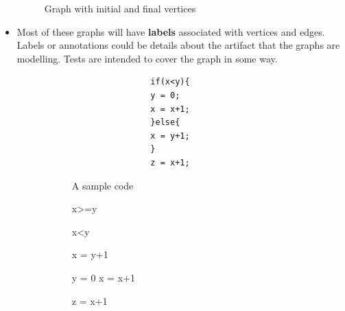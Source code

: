 \documentclass[a4paper]{article}
\begin{document}
\begin{itemize}
\begin{figure}[H]
        \caption{Graph with initial and final vertices}
    \end{figure}
    \item Most of these graphs will have \textbf{labels} associated with vertices and edges. Labels or annotations could be details about the artifact that the graphs are modelling. Tests are intended to cover the graph in some way.
    \begin{figure}[H]
        \centering
        \begin{subfigure}[b]{0.45\textwidth}
            \begin{verbatim}
                if(x<y){
                y = 0;
                x = x+1;
                }else{
                x = y+1;
                }
                z = x+1;
            \end{verbatim}
            \caption{A sample code}
        \end{subfigure}
        \hfill
        \begin{subfigure}[b]{0.45\textwidth}
            \begin{myverbbox}{\edgeONE}
                x>=y
            \end{myverbbox}
            \begin{myverbbox}{\edgeTWO}
                x<y
            \end{myverbbox}
            \begin{myverbbox}{\vertexONE}
                x = y+1
            \end{myverbbox}
            \begin{myverbbox}{\vertexTWO}
                y = 0
                x = x+1
            \end{myverbbox}
            \begin{myverbbox}{\vertexTHREE}
                z = x+1
            \end{myverbbox}
            \hspace{-2cm}
\end{subfigure}
\end{figure}
\end{itemize}
\end{document}
